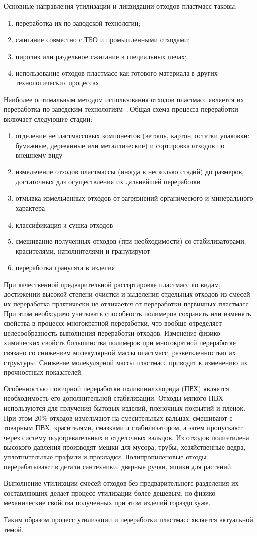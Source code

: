 Основные направления утилизации и ликвидации отходов пластмасс таковы:
\begin{enumerate}
\item переработка их по заводской технологии;
\item сжигание совместно с ТБО и промышленными отходами;
\item пиролиз или раздельное сжигание в специальных печах;
\item использование отходов пластмасс как готового материала в других технологических процессах.
\end{enumerate}

Наиболее оптимальным методом использования отходов пластмасс является их
переработка по заводским технологиям~\cite{utilization}. Общая схема процесса переработки
включает следующие стадии:
\begin{enumerate}[1.]
\item отделение непластмассовых компонентов (ветошь, картон, остатки упаковки:
	бумажные, деревянные или металлические) и сортировка отходов по внешнему виду
\item измельчение отходов пластмассы (иногда в несколько стадий) до размеров,
	достаточных для осуществления их дальнейшей переработки
\item отмывка измельченных отходов от загрязнений органического и минерального
	характера
\item классификация и сушка отходов
\item смешивание полученных отходов (при необходимости) со стабилизаторами,
	красителями, наполнителями и гранулируют
\item переработка гранулята в изделия
\end{enumerate}

При качественной предварительной рассортировке пластмасс по видам, достижении высокой
степени очистки и выделения отдельных отходов из смесей их переработка практически не
отличается от переработки первичных пластмасс. При этом необходимо учитывать способность
полимеров сохранять или изменять свойства в процессе многократной переработки, что
вообще определяет целесообразность выполнения переработки отходов. Изменение физико-химических
свойств большинства полимеров при многократной переработке связано со снижением молекулярной
массы пластмасс, разветвленностью их структуры. Снижение молекулярной массы пластмасс
приводит к изменению их прочностных показателей.

Особенностью повторной переработки поливинилхлорида (ПВХ) является необходимость
его дополнительной стабилизации. Отходы мягкого ПВХ используются для получения
бытовых изделий, пленочных покрытий и пленок. При этом 20\% отходов измельчают
на смесительных вальцах, смешивают с товарным ПВХ, красителями, смазками и
стабилизатором, а затем пропускают через систему подогревательных и отделочных
вальцов. Из отходов полиэтилена высокого давления производят мешки для мусора,
трубы, хозяйственные ведра, уплотнительные профили и прокладки. Полипропиленовые
отходы перерабатывают в детали сантехники, дверные ручки, ящики для растений.

Выполнение утилизации смесей отходов без предварительного разделения их
составляющих делает процесс утилизации более дешевым, но физико-механические
свойства полученных при этом изделий гораздо хуже.

Таким образом процесс утилизации и переработки пластмасс является актуальной темой.

